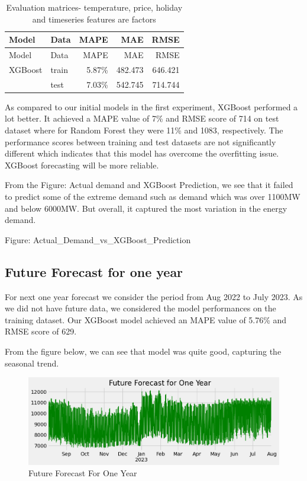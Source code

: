 \documentclass[mstat,12pt]{unswthesis}
\begin{document}
\begin{longtable}[]{@{}llrrr@{}}
\caption{Evaluation matrices- temperature, price, holiday and timeseries
features are factors}\tabularnewline
\toprule\noalign{}
Model & Data & MAPE & MAE & RMSE \\
\midrule\noalign{}
\endfirsthead
\toprule\noalign{}
Model & Data & MAPE & MAE & RMSE \\
\midrule\noalign{}
\endhead
\bottomrule\noalign{}
\endlastfoot
XGBoost & train & 5.87\% & 482.473 & 646.421 \\
& test & 7.03\% & 542.745 & 714.744 \\
\end{longtable}

As compared to our initial models in the first experiment, XGBoost
performed a lot better. It achieved a MAPE value of 7\% and RMSE score
of 714 on test dataset where for Random Forest they were 11\% and 1083,
respectively. The performance scores between training and test datasets
are not significantly different which indicates that this model has
overcome the overfitting issue. XGBoost forecasting will be more
reliable.

From the Figure: Actual demand and XGBoost Prediction, we see that it
failed to predict some of the extreme demand such as demand which was
over 1100MW and below 6000MW. But overall, it captured the most
variation in the energy demand.

Figure: Actual\_Demand\_vs\_XGBoost\_Prediction

\hypertarget{future-forecast-for-one-year}{%
\subsection{Future Forecast for one
year}\label{future-forecast-for-one-year}}

For next one year forecast we consider the period from Aug 2022 to July
2023. As we did not have future data, we considered the model
performances on the training dataset. Our XGBoost model achieved an MAPE
value of 5.76\% and RMSE score of 629.

From the figure below, we can see that model was quite good, capturing
the seasonal trend.

\begin{figure}[H]
\includegraphics[width=1\linewidth,]{images/Future_Forecast_One_Year} \caption{Future Forecast For One Year}\label{fig:Future-Forecast-One-Year}
\end{figure}
\end{document}

